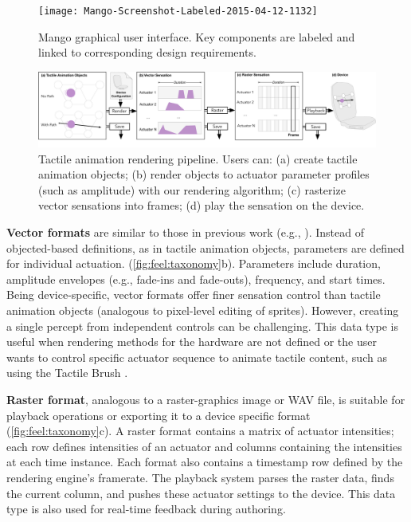 \begin{figure}[tbh] %
   \centering
   \texttt{[image: Mango-Screenshot-Labeled-2015-04-12-1132]} 
   \caption{Mango graphical user interface. Key components are labeled and linked to corresponding design requirements.}
   \label{fig:implementation:screenshot}
\end{figure}

 \begin{figure}[t] %
   \centering
   \includegraphics[width=1.0\textwidth]{images/Fig2-FeelTaxonomy-2015-04-14-1332}%
   \caption{Tactile animation rendering pipeline. Users can: (a) create tactile animation objects; (b) render objects to actuator parameter profiles (such as amplitude) with our rendering algorithm; (c) rasterize vector sensations into frames; (d) play the sensation on the device.}
   \label{fig:feel:taxonomy}
\end{figure}

\textbf{Vector formats} are similar to those in previous work (e.g., \cite{Enriquez2003}).
Instead of objected-based definitions, as in tactile animation objects, parameters are defined for individual actuation. %
(\autoref{fig:feel:taxonomy}b).
Parameters include duration, amplitude envelopes (e.g., fade-ins and fade-outs), frequency, and start times.
Being device-specific, vector formats %
offer finer sensation control than tactile animation objects (analogous to pixel-level editing of sprites).
However, creating a single percept from independent controls can be challenging.
This data type is useful when rendering methods for the hardware are not defined or the user wants to control specific actuator sequence to animate tactile content, such as using the Tactile Brush \cite{Israr2011a}. 

\textbf{Raster format}, analogous to a raster-graphics image or WAV file, is suitable for playback operations or exporting it to a device specific format (\autoref{fig:feel:taxonomy}c).
A raster format contains a matrix of actuator intensities; each row defines intensities of an actuator and columns containing the intensities at each time instance. Each format also contains a timestamp row defined by the rendering engine's framerate.  
The playback system parses the raster data, finds the current column, and pushes these actuator settings to the device. %
This data type is also used for real-time feedback during authoring.

